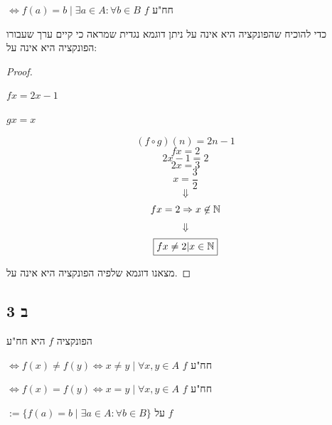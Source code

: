 \documentclass{article}
\begin{document}
\begin{define}
    $\iff f(a) = b \; | \; \exists a \in A : \forall b \in B $
    $f$ חח"ע
\end{define}
כדי להוכיח שהפונקציה היא אינה על ניתן דוגמא נגדית שמראה כי קיים ערך שעבורו הפונקציה היא אינה על:

\begin{proof}
    \begin{ex}
        \begin{ass}
            $ fx = 2x - 1 $
        \end{ass}
        \begin{ass}
            $ gx = x $
        \end{ass}
    \end{ex}
    \[
        (f \circ g) (n) = 2n-1
    \]
    \[
        fx = 2
    \]
    \[
        2x - 1 = 2
    \]
    \[
        2x = 3
    \]
    \[
        x = \frac{3}{2}
    \]
    \[\Downarrow\]
    \[
        fx = 2 \Rightarrow x \not \in \Bbb{N}
    \]
    \[\Downarrow\]
    \[
        \boxed{fx \not = 2 | x \in \Bbb{N}}
    \]

מצאנו דוגמא שלפיה הפונקציה היא אינה על. \square

\end{proof}

\newpage

\subsection*{3 ב}

\begin{ntp}
    הפונקציה $f$ היא חח"ע
\end{ntp}

\begin{define}
    $ \iff f(x) \not = f(y) \iff x \not = y \; | \; \forall x, y \in A $
    $f$ חח"ע
\end{define}

\begin{sen}
    $ \iff f(x) = f(y) \iff x = y \; | \; \forall x, y \in A $
    $f$ חח"ע
\end{sen}

\begin{define}
    $ := \{ f(a) = b \; | \; \exists a \in A : \forall b \in B \} $
    על $f$
\end{define}
\end{document}
